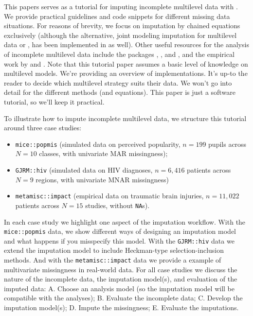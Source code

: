 \documentclass[
]{jss}
\providecommand{\tightlist}{%
  \setlength{\itemsep}{0pt}\setlength{\parskip}{0pt}}
\begin{document}
This papers serves as a tutorial for imputing incomplete multilevel data
with . We provide practical guidelines and code snippets for
different missing data situations. For reasons of brevity, we focus on
imputation by chained equations exclusively (although the alternative,
joint modeling imputation for multilevel data or 
\citet{jomo}, has been implemented in  as well). Other useful
resources for the analysis of incomplete multilevel data include the
 packages , , and , and
the empirical work by \citet{audi18} and \citet{grun18}. Note that this
tutorial paper assumes a basic level of knowledge on multilevel models.
We're providing an overview of implementations. It's up-to the reader to
decide which multilevel strategy suits their data. We won't go into
detail for the different methods (and equations). This paper is just a
software tutorial, so we'll keep it practical.

To illustrate how to impute incomplete multilevel data, we structure
this tutorial around three case studies:

\begin{itemize}
\tightlist
\item
  \texttt{mice::popmis} (simulated data on perceived popularity,
  \(n = 199\) pupils across \(N = 10\) classes, with univariate MAR
  missingness);
\item
  \texttt{GJRM::hiv} (simulated data on HIV diagnoses, \(n = 6,416\)
  patients across \(N = 9\) regions, with univariate MNAR missingness)
\item
  \texttt{metamisc::impact} (empirical data on traumatic brain injuries,
  \(n = 11,022\) patients across \(N = 15\) studies, without
  \texttt{NA}s).
\end{itemize}

In each case study we highlight one aspect of the imputation workflow.
With the \texttt{mice::popmis} data, we show different ways of designing
an imputation model and what happens if you misspecify this model. With
the \texttt{GJRM::hiv} data we extend the imputation model to include
Heckman-type selection-inclusion methods. And with the
\texttt{metamisc::impact} data we provide a example of multivariate
missingness in real-world data. For all case studies we discuss the
nature of the incomplete data, the imputation model(s), and evaluation
of the imputed data: A. Choose an analysis model (so the imputation
model will be compatible with the analyses); B. Evaluate the incomplete
data; C. Develop the imputation model(s); D. Impute the missingness; E.
Evaluate the imputations.
\end{document}
